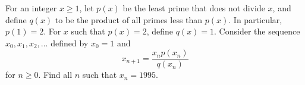 For an integer $x \geq 1$, let $p(x)$ be the least prime that does not divide $x$, and define $q(x)$ to be the product of all primes less than $p(x)$. In particular, $p(1) = 2$. For $x$ such that $p(x) = 2$, define $q(x) = 1$. Consider the sequence $x_0, x_1, x_2, \ldots$ defined by $x_0 = 1$ and
\[ x_{n+1} = \frac{x_n p(x_n)}{q(x_n)} \]
for $n \geq 0$. Find all $n$ such that $x_n = 1995$.
